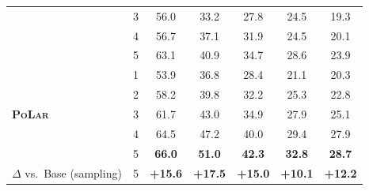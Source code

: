 \documentclass{article}
\theoremstyle{plain}
\theoremstyle{definition}
\theoremstyle{remark}
\newcommand\ours{\textsc{PoLar}\xspace}
\begin{document}
\begin{table}[t]
{\begin{tabular}{llccccc}
& 3 & 56.0 & 33.2 & 27.8 & 24.5 & 19.3 \\
& 4 & 56.7 & 37.1 & 31.9 & 24.5 & 20.1 \\
& 5 & 63.1 & 40.9 & 34.7 & 28.6 & 23.9 \\
\midrule
\multirow{5}{*}{\textbf{\ours}}
& 1 & 53.9 & 36.8 & 28.4 & 21.1 & 20.3 \\
& 2 & 58.2 & 39.8 & 32.2 & 25.3 & 22.8 \\
& 3 & 61.7 & 43.0 & 34.9 & 27.9 & 25.1 \\
& 4 & 64.5 & 47.2 & 40.0 & 29.4 & 27.9 \\
\rowcolor{blue!10}
& 5 & \textbf{66.0} & \textbf{51.0} & \textbf{42.3} & \textbf{32.8} & \textbf{28.7} \\
\midrule
$\Delta$ vs.\ Base (sampling) & 5 & \textbf{+15.6} & \textbf{+17.5} & \textbf{+15.0} & \textbf{+10.1} & \textbf{+12.2} \\
\bottomrule
\end{tabular}}
\end{table}
\end{document}

